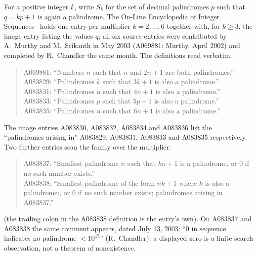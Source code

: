 \documentclass[12pt]{article}
\begin{document}
For a positive integer $k$, write $S_k$ for the set of
decimal palindromes $p$ such that $q = kp+1$ is again a
palindrome. The On-Line Encyclopedia of Integer
Sequences~\cite{oeis} holds one entry per multiplier
$k = 2, \dots, 6$ together with, for $k \ge 3$, the image
entry listing the values $q$; all six source entries were
contributed by A.~Murthy and M.~Srikanth in May 2003
(A069881: Murthy, April 2002) and completed by
R.~Chandler the same month. The definitions read
verbatim:
\begin{quote}
A069881: ``Numbers $n$ such that $n$ and $2n+1$ are both
palindromes.''\\
A083829: ``Palindromes $k$ such that $3k + 1$ is also a
palindrome.''\\
A083831: ``Palindromes $n$ such that $4n + 1$ is also a
palindrome.''\\
A083833: ``Palindromes $p$ such that $5p + 1$ is also a
palindrome.''\\
A083835: ``Palindromes $n$ such that $6n + 1$ is also a
palindrome.''
\end{quote}
The image entries A083830, A083832, A083834 and A083836
list the ``palindromes arising in'' A083829, A083831,
A083833 and A083835 respectively. Two further entries
scan the family over the multiplier:
\begin{quote}
A083837: ``Smallest palindrome $n$ such that $kn + 1$
is a palindrome, or $0$ if no such number exists.''\\
A083838: ``Smallest palindrome of the form $nk+1$ where
$k$ is also a palindrome:, or $0$ if no such number
exists; palindromes arising in A083837.''
\end{quote}
(the trailing colon in the A083838 definition is the
entry's own). On A083837 and A083838 the same comment
appears, dated July 13, 2003: ``0 in sequence indicates
no palindrome $< 10^{15}$'' (R.~Chandler): a displayed
zero is a finite-search observation, not a theorem of
nonexistence.
\end{document}
